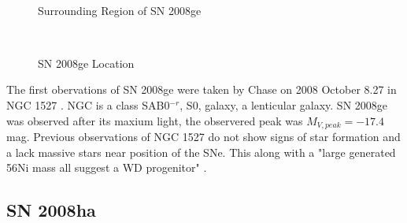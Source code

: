 \documentclass[preprint]{aastex}
\begin{document}
\begin{figure}[htp]
  \centering

  \vspace*{\fill}  
  \\
  \vspace*{\fill}  
   \label{fig:Regions08ge}\caption{Surrounding Region of SN 2008ge}
\end{figure}

\begin{figure}[htp]
  \centering

  \vspace*{\fill}
  \\
  \vspace*{\fill}  
  \label{fig:Sources08ge}\caption{SN 2008ge Location}
\end{figure}

The first obervations of SN 2008ge were taken by
Chase on 2008 October 8.27 in NGC 1527 \citep{pig08}. 
NGC is a class SAB0$^{-r}$, S0, galaxy, a lenticular galaxy. 
SN 2008ge was observed after its maxium light, the observered peak was 
$M_{V,peak} = -17.4$ mag.%
Previous observations of NGC 1527 do not show 
signs of star formation and a lack massive stars near 
position of the SNe. 
This along with a "large generated 56Ni mass all suggest a WD progenitor"  \citep{fol1011}.


\subsection{SN 2008ha}
\end{document}
